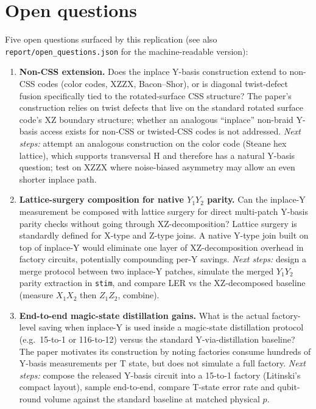 \section{Open questions}
\label{sec:open}

Five open questions surfaced by this replication (see also
\texttt{report/open\_questions.json} for the machine-readable version):

\begin{enumerate}

\item \textbf{Non-CSS extension.} Does the inplace Y-basis construction extend
to non-CSS codes (color codes, XZZX, Bacon--Shor), or is diagonal twist-defect
fusion specifically tied to the rotated-surface CSS structure? The paper's
construction relies on twist defects that live on the standard rotated surface
code's XZ boundary structure; whether an analogous ``inplace'' non-braid
Y-basis access exists for non-CSS or twisted-CSS codes is not addressed.
\emph{Next steps:} attempt an analogous construction on the color code
(Steane hex lattice), which supports transversal H and therefore has a
natural Y-basis question; test on XZZX where noise-biased asymmetry may allow
an even shorter inplace path.

\item \textbf{Lattice-surgery composition for native $Y_1Y_2$ parity.} Can the
inplace-Y measurement be composed with lattice surgery for direct multi-patch
Y-basis parity checks without going through XZ-decomposition? Lattice surgery
is standardly defined for X-type and Z-type joins. A native Y-type join built
on top of inplace-Y would eliminate one layer of XZ-decomposition overhead in
factory circuits, potentially compounding per-Y savings. \emph{Next steps:}
design a merge protocol between two inplace-Y patches, simulate the merged
$Y_1Y_2$ parity extraction in \texttt{stim}, and compare LER vs the
XZ-decomposed baseline (measure $X_1X_2$ then $Z_1Z_2$, combine).

\item \textbf{End-to-end magic-state distillation gains.} What is the actual
factory-level saving when inplace-Y is used inside a magic-state distillation
protocol (e.g.\ 15-to-1 or 116-to-12) versus the standard Y-via-distillation
baseline? The paper motivates its construction by noting factories consume
hundreds of Y-basis measurements per T state, but does not simulate a full
factory. \emph{Next steps:} compose the released Y-basis circuit into a
15-to-1 factory (Litinski's compact layout), sample end-to-end, compare
T-state error rate and qubit-round volume against the standard baseline at
matched physical $p$.


\end{enumerate}
